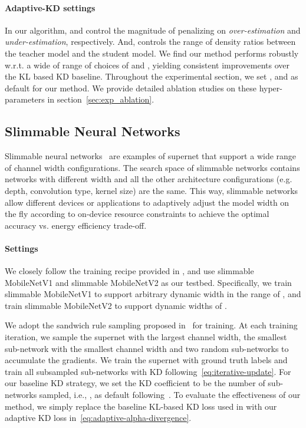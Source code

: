 \documentclass{article}
\begin{document}
\paragraph{Adaptive-KD settings}
In our algorithm,  and  control the magnitude of penalizing on \emph{over-estimation} and \emph{under-estimation}, respectively. And,  controls the range of density ratios between the teacher model and the student model.
We find our method performs robustly w.r.t. a wide of range of choices of  and , yielding consistent improvements over the KL based KD baseline.  
Throughout the experimental section, we set ,  and  as default for our method. We provide detailed ablation studies on these hyper-parameters in section~\ref{sec:exp_ablation}. 

\subsection{Slimmable  Neural Networks}
\label{sec:exp_slimmable}
Slimmable neural networks~\citep{yu2018slimmable, yu2019universally} are examples of supernet that support a wide range of channel width configurations. The search space  of slimmable networks contains networks with different width and all the other architecture configurations (e.g. depth, convolution type, kernel size) are the same.
This way, 
slimmable networks allow different devices or applications to adaptively adjust the model width on the fly according to on-device resource constraints to achieve the optimal accuracy vs. energy efficiency trade-off. 


\paragraph{Settings}
We closely follow the training recipe provided in \citet{yu2019universally}, 
and use slimmable MobileNetV1 \citep{howard2017mobilenets} 
and slimmable MobileNetV2 \citep{sandler2018mobilenetv2} as our testbed.
Specifically, we train slimmable MobileNetV1 to support arbitrary dynamic width in the range of , and train slimmable MobileNetV2 to support 
dynamic widths of . 

We adopt the sandwich rule sampling proposed in~\citet{yu2019universally} for training. At each training iteration, 
we sample the supernet with the largest channel width, 
the smallest sub-network with the smallest channel width and two random sub-networks to accumulate the gradients.
We train the supernet with ground truth labels and 
train all subsampled sub-networks with KD following~\eqref{eq:iterative-update}. 
For our baseline KD strategy, we set the KD coefficient  to be the number of sub-networks sampled, i.e., , as default  following~\citet{yu2019universally}.
To evaluate the effectiveness of our method, 
we simply replace the baseline KL-based KD loss used in \citet{yu2019universally} with our adaptive KD loss in~\eqref{eq:adaptive-alpha-divergence}. 
\end{document}
